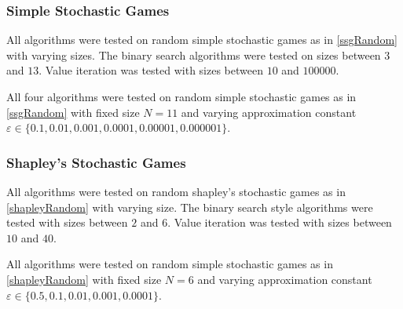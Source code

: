 \subsubsection{Simple Stochastic Games}
\begin{test} \label{ssgMainTest}
  All algorithms were tested on random simple stochastic
  games as in \cref{ssgRandom} with varying sizes. The binary
  search algorithms were tested on sizes between $3$ and $13$.
  Value iteration was tested with sizes between $10$ and $100000$.
\end{test}
\begin{test} \label{ssgApproxTest}
  All four algorithms were tested on random simple stochastic
  games as in \cref{ssgRandom} with fixed size $N = 11$ and varying
  approximation constant $\varepsilon \in \{ 0.1, 0.01, 0.001, 0.0001, 0.00001, 0.000001 \}$.
\end{test}

\subsubsection{Shapley's Stochastic Games}
\begin{test} \label{shapleyMainTest}
  All algorithms were tested on random shapley's stochastic games
  as in \cref{shapleyRandom} with varying size. The binary search style algorithms
  were tested with sizes between $2$ and $6$. Value iteration was tested with
  sizes between $10$ and $40$.
\end{test}

\begin{test} \label{shapleyApproxTest}
  All algorithms were tested on random simple stochastic
  games as in \cref{shapleyRandom} with fixed size $N = 6$ and varying
  approximation constant $\varepsilon \in \{ 0.5, 0.1, 0.01, 0.001, 0.0001 \}$.
\end{test}
